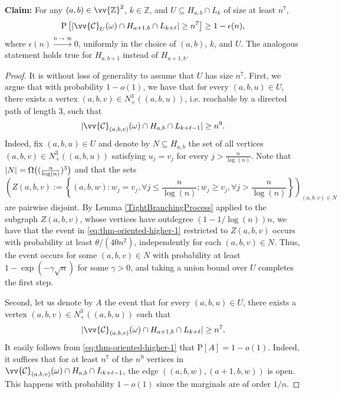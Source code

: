 \documentclass[11pt]{article}
\renewcommand{\P}{\mathrm{P}}
\newcommand{\Z}{\mathbb{Z}}
\DeclarePairedDelimiter{\abs}{\lvert}{\rvert}
\theoremstyle{remark}
\begin{document}
    \textbf{Claim:} For any $(a,b) \in \vv{\Z}^2$, $k \in \Z$, and $U \subseteq H_{a,b} \cap L_k$ of size at least $n^7$, 
    $$\P\left[|\vv{\mathcal{C}}_{U}(\omega) \cap H_{a+1,b} \cap L_{k + \ell}| \geq n^7\right] \ge 1 - \epsilon(n),$$
    where $\epsilon(n) \xrightarrow{n \to \infty}0$, uniformly in the choice of $(a,b)$, $k$, and $U$. The analogous statement holds true  for $H_{a,b+1}$ instead of $H_{a+1,b}$.
    \begin{proof}
    It is without loss of generality to assume that $U$ has size $n^7$. First, we argue that with probability $1-o(1)$, we have that for every $(a,b,u) \in U$, there exists a vertex $(a,b,v) \in N_+^3((a,b,u))$, i.e. reachable by a directed path of length $3$, such that 
        \begin{equation}\label{eq:thm-oriented-higher-1}
            |\vv{\mathcal{C}}_{(a,b,v)}(\omega) \cap H_{a,b} \cap L_{k + \ell - 1}| \geq n^{9}.
        \end{equation}        
    Indeed, fix $(a,b,u) \in U$ and denote by $N \subseteq H_{a,b}$ the set of all vertices  $(a,b,v) \in N_+^3((a,b,u))$ satisfying $u_j = v_j$ for every $j>\frac{n}{\log(n)}$. Note that $\abs{N} = \Omega \big( (\frac{n}{\log(n)})^3 \big)$ and that the sets 
        \begin{equation}
            \left(Z(a,b,v) := \left\{(a,b,w) : w_j = v_j, \forall j \le \frac{n}{\log(n)}; w_j \ge v_j, \forall j > \frac{n}{\log(n)}\right\}\right)_{(a,b,v) \in N}
        \end{equation}
    are pairwise disjoint. By Lemma \ref{TightBranchingProcess} applied to the subgraph $Z(a,b,v)$, whose vertices have outdegree $(1-1/\log(n))n$, we have that the event in \eqref{eq:thm-oriented-higher-1} restricted to $Z(a,b,v)$ occurs with probability at least $\theta/(40 n^2)$, independently for each $(a,b,v) \in N$. Thus, the event occurs for some $(a,b,v) \in N$ with probability at least $1-\exp(-\gamma \sqrt{n})$ for some $\gamma >0$, and taking a union bound over $U$ completes the first step. 

    Second, let us denote by $A$ the event that for every $(a,b,u) \in U$, there exists a vertex $(a,b,v) \in N_+^3((a,b,u))$ such that 
        \begin{equation}\label{eq:thm-oriented-higher-2}
            |\vv{\mathcal{C}}_{(a,b,v)}(\omega) \cap H_{a+1,b} \cap L_{k + \ell}| \geq n^{7}.
        \end{equation}  
    It easily follows from \eqref{eq:thm-oriented-higher-1} that $\P[A] = 1-o(1)$.
    Indeed, it suffices that for at least $n^7$ of the $n^{9}$ vertices in $\vv{\mathcal{C}}_{(a,b,v)}(\omega) \cap H_{a,b} \cap L_{k + \ell - 1}$, the edge $((a,b,w),(a+1,b,w))$ is open. This happens with probability $1-o(1)$ since the marginals are of order $1/n$.


\end{proof}
\end{document}
